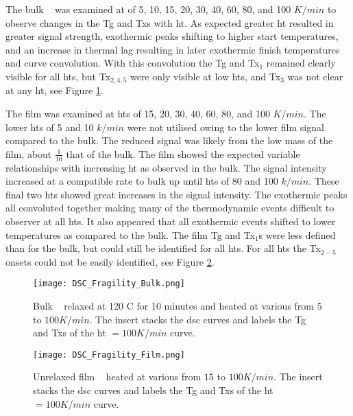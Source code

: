 \documentclass[a4paper,12pt,oneside]{article}%
\begin{document}
The bulk \MgZnCa~ was examined at  of 5, 10, 15, 20, 30, 40, 60, 80, and 100 $K/min$ to observe changes in the \gls{Tg} and \glspl{Tx} with \gls{ht}. As expected greater \gls{ht} resulted in greater signal strength, exothermic peaks shifting to higher start temperatures, and an increase in thermal lag resulting in later exothermic finish temperatures and curve convolution. With this convolution the \gls{Tg} and \gls{Tx}$_{1}$  remained clearly visible for all \glspl{ht}, but \gls{Tx}$_{2,4,5}$ were only visible at low \glspl{ht}, and \gls{Tx}$_{3}$ was not clear at any \gls{ht}, see Figure \ref{fig:DSC_vHeatingRate_Bulk}.

The film was examined at \glspl{ht} of 15, 20, 30, 40, 60, 80, and 100 $K/min$. The lower \glspl{ht} of 5 and 10 $k/min$ were not utilised owing to the lower film signal compared to the bulk. The reduced signal was likely from the low mass of the film, about $\frac{1}{10}$ that of the bulk. The film showed the expected variable relationships with increasing \gls{ht} as observed in the bulk. The signal intensity increased at a compatible rate to bulk up until \glspl{ht} of 80 and 100 $k/min$. These final two \glspl{ht} showed great increases in the signal intensity. The exothermic peaks all convoluted together making many of the thermodynamic events difficult to observer at all \glspl{ht}. It also appeared that all exothermic events shifted to lower temperatures as compared to the bulk. The film \gls{Tg} and \gls{Tx}$_{1}$s were less defined than for the bulk, but could still be identified for all \glspl{ht}. For all \glspl{ht} the \gls{Tx}$_{2-5}$ onsets could not be easily identified, see Figure \ref{fig:DSC_vHeatingRate_Film}.

\begin{figure}[b]
	\centering
	\texttt{[image: DSC\_Fragility\_Bulk.png]}
	\caption{Bulk \MgZnCa~ relaxed at 120 \degree C for 10 minutes and heated at various  from $5$ to $100 K/min$. The insert stacks the \gls{dsc} curves and labels the \gls{Tg} and \glspl{Tx} of the \gls{ht} $=100 K/min$ curve.}%
	\label{fig:DSC_vHeatingRate_Bulk}
\end{figure}

\begin{figure}[b]
	\centering
	\texttt{[image: DSC\_Fragility\_Film.png]}
	\caption{Unrelaxed film \MgZnCa~ heated at various   from $15$ to $100 K/min$. The insert stacks the \gls{dsc} curves and labels the \gls{Tg} and \glspl{Tx} of the \gls{ht} $=100 K/min$ curve.}%
	\label{fig:DSC_vHeatingRate_Film}
\end{figure}
\end{document}
